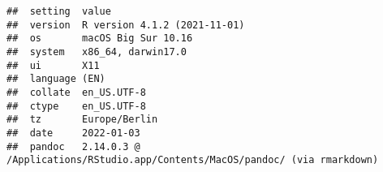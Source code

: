 \documentclass[
  10pt,
]{article}
\newenvironment{Shaded}{\begin{snugshade}}{\end{snugshade}}
\newcommand{\AttributeTok}[1]{\textcolor[rgb]{0.77,0.63,0.00}{#1}}
\newcommand{\FunctionTok}[1]{\textcolor[rgb]{0.00,0.00,0.00}{#1}}
\newcommand{\NormalTok}[1]{#1}
\newcommand{\SpecialCharTok}[1]{\textcolor[rgb]{0.00,0.00,0.00}{#1}}
\newcommand{\StringTok}[1]{\textcolor[rgb]{0.31,0.60,0.02}{#1}}
\begin{document}
\begin{verbatim}
##  setting  value
##  version  R version 4.1.2 (2021-11-01)
##  os       macOS Big Sur 10.16
##  system   x86_64, darwin17.0
##  ui       X11
##  language (EN)
##  collate  en_US.UTF-8
##  ctype    en_US.UTF-8
##  tz       Europe/Berlin
##  date     2022-01-03
##  pandoc   2.14.0.3 @ /Applications/RStudio.app/Contents/MacOS/pandoc/ (via rmarkdown)
\end{verbatim}

\begin{Shaded}
\end{Shaded}
\end{document}

